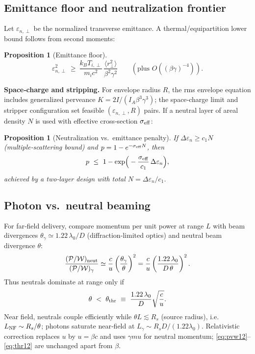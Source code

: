 \documentclass[aps,pre,twocolumn,showpacs,superscriptaddress]{revtex4-2}
\newtheorem{proposition}[theorem]{Proposition}
\theoremstyle{definition}
\begin{document}
\subsection{Emittance floor and neutralization frontier}\label{subsec:emit11}

Let $\varepsilon_{n,\perp}$ be the normalized transverse emittance. A thermal/equipartition lower bound follows from second moments:
\begin{proposition}[Emittance floor]\label{prop:emit11}
\begin{equation}
\varepsilon_{n,\perp}^2 \ \ge\ \frac{k_B T_{i,\perp}}{m_i c^2}\,\frac{\langle r_\perp^2\rangle}{\beta^2\gamma^2} \qquad (\text{plus }O((\beta\gamma)^{-4})).
\end{equation}
\end{proposition}
\noindent\textbf{Space‑charge and stripping.} For envelope radius $R$, the rms envelope equation includes generalized perveance $K=2I/(I_A \beta^3\gamma^3)$; the space‑charge limit and stripper configuration set feasible $(\varepsilon_{n,\perp}, R)$ pairs. If a neutral layer of areal density $N$ is used with effective cross‑section $\sigma_{\rm eff}$:
\begin{proposition}[Neutralization vs.\ emittance penalty]\label{prop:neutral11}
If $\Delta\varepsilon_n\ge c_1 N$ (multiple‑scattering bound) and $p=1-e^{-\sigma_{\rm eff} N}$, then
\[
p \ \le\ 1-\exp\!\Big(-\frac{\sigma_{\rm eff}}{c_1}\,\Delta\varepsilon_n\Big),
\]
achieved by a two‑layer design with total $N=\Delta\varepsilon_n/c_1$.
\end{proposition}

\subsection{Photon vs.\ neutral beaming}\label{subsec:photon12}

For far‑field delivery, compare momentum per unit power at range $L$ with beam divergences $\theta_\gamma\simeq 1.22\,\lambda_0/D$ (diffraction‑limited optics) and neutral beam divergence $\theta$:
\begin{equation}\label{eq:pvw12}
\frac{(\mathcal{P}/\mathcal{W})_{\rm neut}}{(\mathcal{P}/\mathcal{W})_{\gamma}}
\simeq \frac{c}{u}\left(\frac{\theta_\gamma}{\theta}\right)^2
= \frac{c}{u}\left(\frac{1.22\,\lambda_0}{D\,\theta}\right)^2.
\end{equation}
Thus neutrals dominate at range only if
\begin{equation}\label{eq:thr12}
\theta \ <\ \theta_{\rm thr}\ \equiv\ \frac{1.22\,\lambda_0}{D}\sqrt{\frac{c}{u}}.
\end{equation}
Near field, neutrals couple efficiently while $\theta L\lesssim R_s$ (source radius), i.e.\ $L_{\rm NF}\sim R_s/\theta$; photons saturate near‑field at $L_\gamma\sim R_s D/(1.22\lambda_0)$. Relativistic correction replaces $u$ by $u=\beta c$ and uses $\gamma m u$ for neutral momentum; \eqref{eq:pvw12}–\eqref{eq:thr12} are unchanged apart from $\beta$.
\end{document}
